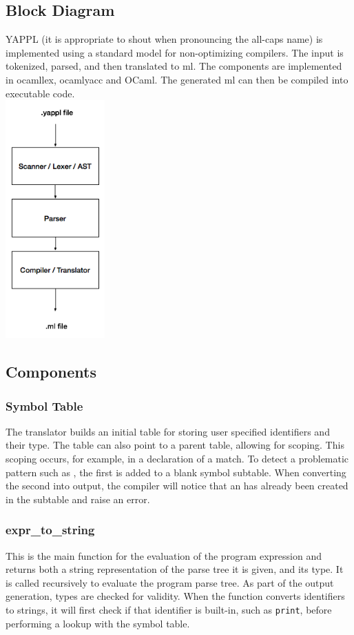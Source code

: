 \subsection{Block Diagram}

YAPPL (it is appropriate to shout when pronouncing the all-caps name) is implemented using a standard model for non-optimizing compilers. The input is tokenized, parsed, and then translated to ml. The components are implemented in ocamllex, ocamlyacc and OCaml. The generated ml can then be compiled into executable code. \\
\includegraphics[width=1.5in]{block-diagram.png}

\subsection{Components}
\subsubsection{Symbol Table}
The translator builds an initial table for storing user specified identifiers and their type. The table can also point to a parent table, allowing for scoping. This scoping occurs, for example, in a declaration of a \term{(}  \term{::}  \term{)} match. To detect a problematic pattern such as  , the first  is added to a blank symbol subtable. When converting the second  into output, the compiler will notice that an  has already been created in the subtable and raise an error. 
\subsubsection{expr\_to\_string} 
This is the main function for the evaluation of the program expression and returns both a string representation of the parse tree it is given, and its type. It is called recursively to evaluate the program parse tree. As part of the output generation, types are checked for validity. When the function converts identifiers to strings, it will first check if that identifier is built-in, such as \texttt{print}, before performing a lookup with the symbol table.
